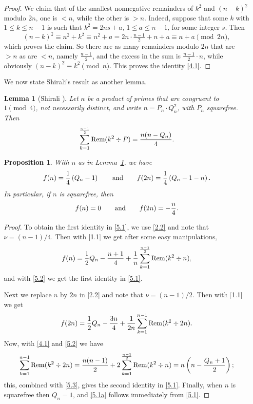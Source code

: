 \documentclass{amsart}
\theoremstyle{plain}
\newtheorem{proposition}[theorem]{Proposition}
\newtheorem{lemma}[theorem]{Lemma}
\numberwithin{equation}{section}
\begin{document}
\begin{proof}
We claim that of the smallest nonnegative remainders of $k^2$ and $(n-k)^2$
modulo $2n$, one is $<n$, while the other is $>n$.
Indeed, suppose that some $k$ with $1\leq k\leq n-1$ is such that
$k^2=2ns+a$, $1\leq a\leq n-1$, for some integer $s$. Then
\[
(n-k)^2\equiv n^2+k^2\equiv n^2+a = 2n\cdot\tfrac{n-1}{2}+n+a
\equiv n+a\pmod{2n},
\]
which proves the claim. So there are as many remainders modulo $2n$ that are
$>n$ as are $<n$, namely $\frac{n-1}{2}$, and the excess in the sum is
$\frac{n-1}{2}\cdot n$, while obviously $(n-k)^2\equiv k^2\pmod{n}$. This proves
the identity \eqref{4.1}.
\end{proof}

We now state Shirali's result as another lemma.

\begin{lemma}[Shirali \cite{Sh}]\label{lem:5.2}
Let $n$ be a product of primes that are congruent to $1\pmod{4}$, not 
necessarily distinct, and write $n=P_n\cdot Q_n^2$, with $P_n$ squarefree. Then
\begin{equation}\label{5.2}
\sum_{k=1}^{\frac{n-1}{2}}{\rm Rem}(k^2\div P) = \frac{n(n-Q_n)}{4}.
\end{equation}
\end{lemma}

\begin{proposition}\label{prop:5.1}
With $n$ as in Lemma~\ref{lem:5.2}, we have
\begin{equation}\label{5.1}
f(n)=\frac{1}{4}\left(Q_n-1\right)\qquad\hbox{and}\qquad 
f(2n)=\frac{1}{4}\left(Q_n-1-n\right).
\end{equation}
In particular, if $n$ is squarefree, then
\begin{equation}\label{5.1a}
f(n)=0\qquad\hbox{and}\qquad f(2n)=-\frac{n}{4}.
\end{equation}
\end{proposition}

\begin{proof}
To obtain the first identity in \eqref{5.1}, we use \eqref{2.2} and note that
$\nu=(n-1)/4$. Then with \eqref{1.1} we get after some easy manipulations,
\[
f(n)=\frac{1}{2}Q_n-\frac{n+1}{4}
+\frac{1}{n}\sum_{k=1}^{\frac{n-1}{2}}{\rm Rem}(k^2\div n),
\]
and with \eqref{5.2} we get the first identity in \eqref{5.1}.

Next we replace $n$ by $2n$ in \eqref{2.2} and note that $\nu=(n-1)/2$. Then
with \eqref{1.1} we get
\begin{equation}\label{5.3}
f(2n)=\frac{1}{2}Q_n-\frac{3n}{4} 
+\frac{1}{2n}\sum_{k=1}^{n-1}{\rm Rem}(k^2\div 2n).
\end{equation}
Now, with \eqref{4.1} and \eqref{5.2} we have
\[
\sum_{k=1}^{n-1}{\rm Rem}(k^2\div 2n) = \frac{n(n-1)}{2}
+2\sum_{k=1}^{\frac{n-1}{2}}{\rm Rem}(k^2\div n) 
= n\left(n-\frac{Q_n+1}{2}\right);
\]
this, combined with \eqref{5.3}, gives the second identity in \eqref{5.1}.
Finally, when $n$ is squarefree then $Q_n=1$, and \eqref{5.1a} follows 
immediately from \eqref{5.1}.
\end{proof}
\end{document}
